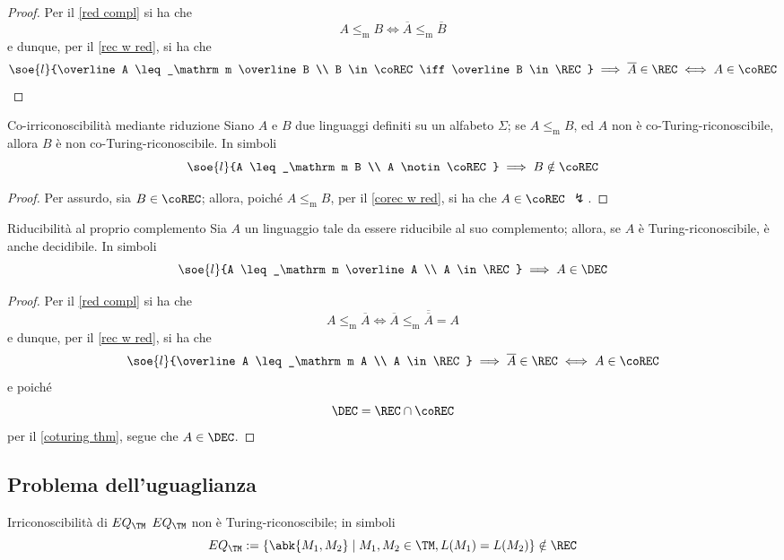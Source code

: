 \documentclass[a4paper, 12pt]{report}
\begin{document}
    \begin{proof}
        Per il \cref{red compl} si ha che $$A \leq_\mathrm m B \iff \overline{A} \leq_\mathrm m \overline B$$ e dunque, per il \cref{rec w red}, si ha che $$\soe{l}{\overline A \leq_\mathrm m \overline B \\ B \in \coREC \iff \overline B \in \REC} \implies \overline A \in \REC \iff A \in \coREC$$ 
    \end{proof}

    \begin{framedcor}[label={corec w red cor}]{Co-irriconoscibilità mediante riduzione}
        Siano $A$ e $B$ due linguaggi definiti su un alfabeto $\Sigma$; se $A \leq_\mathrm m B$, ed $A$ non è co-Turing-riconoscibile, allora $B$ è non co-Turing-riconoscibile. In simboli $$\soe{l}{A \leq_\mathrm m B \\ A \notin \coREC} \implies B \notin \coREC$$
    \end{framedcor}

    \begin{proof}
        Per assurdo, sia $B \in \coREC$; allora, poiché $A \leq_\mathrm m B$, per il \cref{corec w red}, si ha che $A \in \coREC$ $\lightning$.
    \end{proof}

    \begin{framedcor}{Riducibilità al proprio complemento}
        Sia $A$ un linguaggio tale da essere riducibile al suo complemento; allora, se $A$ è Turing-riconoscibile, è anche decidibile. In simboli $$\soe{l}{A \leq_\mathrm m \overline A \\ A \in \REC} \implies A \in \DEC$$
    \end{framedcor}

    \begin{proof}
        Per il \cref{red compl} si ha che $$A \leq_\mathrm m \overline A \iff \overline A \leq_\mathrm m \overline {\overline A} = A$$ e dunque, per il \cref{rec w red}, si ha che $$\soe{l}{\overline A \leq_\mathrm m A \\ A \in \REC} \implies \overline A \in \REC \iff A \in \coREC$$ e poiché $$\DEC = \REC \cap \coREC$$ per il \cref{coturing thm}, segue che $A \in \DEC$.
    \end{proof}

    \subsection{Problema dell'uguaglianza}

    \begin{framedthm}[label={eq_tm not in rec}]{Irriconoscibilità di $EQ_\TM$}
        $EQ_\TM$ non è Turing-riconoscibile; in simboli $$EQ_\TM := \{\abk{M_1, M_2} \mid M_1, M_2 \in \TM, L(M_1) = L(M_2)\} \notin \REC$$
    \end{framedthm}
\end{document}
